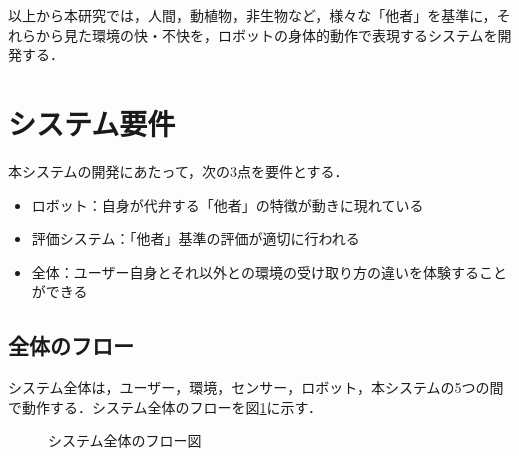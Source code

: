 \documentclass[paper=a4paper,jafontsize=9pt,head_space=15mm,gutter=20mm,
twocolumn,number_of_lines=49, line_length=26zw]{myuarticle}
\begin{document}
以上から本研究では，人間，動植物，非生物など，様々な「他者」を基準に，それらから見た環境の快・不快を，ロボットの身体的動作で表現するシステムを開発する．

\section{システム要件}
本システムの開発にあたって，次の3点を要件とする．
\begin{itemize}
  \item ロボット：自身が代弁する「他者」の特徴が動きに現れている
  \item 評価システム：「他者」基準の評価が適切に行われる
  \item 全体：ユーザー自身とそれ以外との環境の受け取り方の違いを体験することができる
\end{itemize}

\subsection{全体のフロー}
システム全体は，ユーザー，環境，センサー，ロボット，本システムの5つの間で動作する．システム全体のフローを図\ref{fig:system-flow}に示す．

\fboxsep=0pt            %
\fboxrule=1pt            %
\begin{figure}[h]
  \centering
  \caption{システム全体のフロー図}
  \label{fig:system-flow}
\end{figure}
\end{document}
